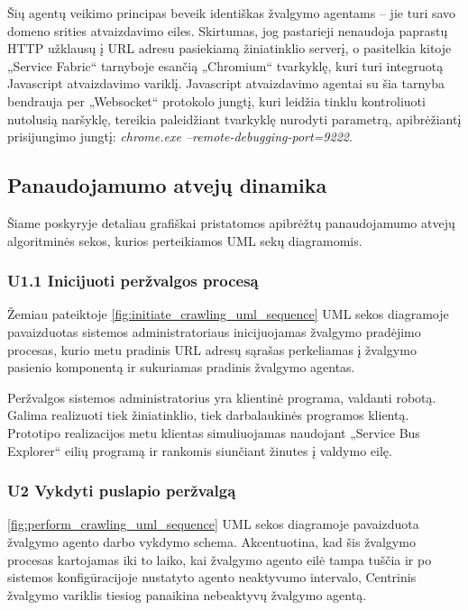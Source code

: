 Šių agentų veikimo principas beveik identiškas žvalgymo agentams -- jie turi savo domeno srities atvaizdavimo eiles. Skirtumas, jog pastarieji nenaudoja paprastų HTTP užklausų į URL adresu pasiekiamą žiniatinklio serverį, o pasitelkia kitoje „Service Fabric“ tarnyboje esančią „Chromium“ tvarkyklę, kuri turi integruotą Javascript atvaizdavimo variklį. Javascript atvaizdavimo agentai su šia tarnyba bendrauja per „Websocket“ protokolo jungtį, kuri leidžia tinklu kontroliuoti nutolusią naršyklę, tereikia paleidžiant tvarkyklę nurodyti parametrą, apibrėžiantį prisijungimo jungtį: \textit{chrome.exe --remote-debugging-port=9222}.

\subsection{Panaudojamumo atvejų dinamika}

Šiame poskyryje detaliau grafiškai pristatomos apibrėžtų panaudojamumo atvejų algoritminės sekos, kurios perteikiamos UML sekų diagramomis. 

\subsubsection{U1.1 Inicijuoti peržvalgos procesą}

Žemiau pateiktoje \ref{fig:initiate_crawling_uml_sequence} UML sekos diagramoje pavaizduotas sistemos administratoriaus inicijuojamas žvalgymo pradėjimo procesas, kurio metu pradinis URL adresų sąrašas perkeliamas į žvalgymo pasienio komponentą ir sukuriamas pradinis žvalgymo agentas.


Peržvalgos sistemos administratorius yra klientinė programa, valdanti robotą. Galima realizuoti tiek žiniatinklio, tiek darbalaukinės programos klientą. Prototipo realizacijos metu klientas simuliuojamas naudojant „Service Bus Explorer“ eilių programą ir rankomis siunčiant žinutes į valdymo eilę.

\subsubsection{U2 Vykdyti puslapio peržvalgą}

\ref{fig:perform_crawling_uml_sequence} UML sekos diagramoje pavaizduota žvalgymo agento darbo vykdymo schema. Akcentuotina, kad šis žvalgymo procesas kartojamas iki to laiko, kai žvalgymo agento eilė tampa tuščia ir po sistemos konfigūracijoje nustatyto agento neaktyvumo intervalo, Centrinis žvalgymo variklis tiesiog panaikina nebeaktyvų žvalgymo agentą.

